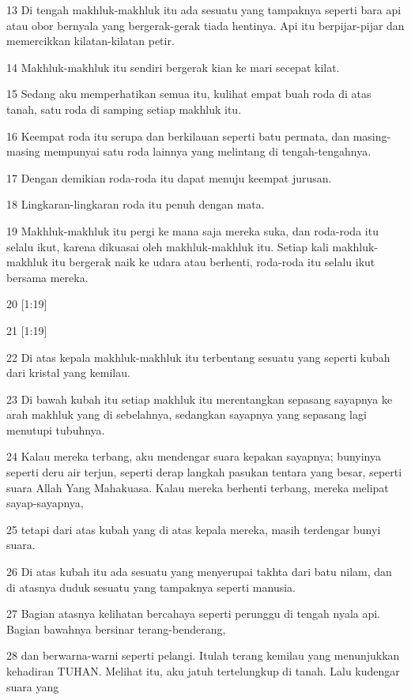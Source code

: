 \par 13 Di tengah makhluk-makhluk itu ada sesuatu yang tampaknya seperti bara api atau obor bernyala yang bergerak-gerak tiada hentinya. Api itu berpijar-pijar dan memercikkan kilatan-kilatan petir.
\par 14 Makhluk-makhluk itu sendiri bergerak kian ke mari secepat kilat.
\par 15 Sedang aku memperhatikan semua itu, kulihat empat buah roda di atas tanah, satu roda di samping setiap makhluk itu.
\par 16 Keempat roda itu serupa dan berkilauan seperti batu permata, dan masing-masing mempunyai satu roda lainnya yang melintang di tengah-tengahnya.
\par 17 Dengan demikian roda-roda itu dapat menuju keempat jurusan.
\par 18 Lingkaran-lingkaran roda itu penuh dengan mata.
\par 19 Makhluk-makhluk itu pergi ke mana saja mereka suka, dan roda-roda itu selalu ikut, karena dikuasai oleh makhluk-makhluk itu. Setiap kali makhluk-makhluk itu bergerak naik ke udara atau berhenti, roda-roda itu selalu ikut bersama mereka.
\par 20 [1:19]
\par 21 [1:19]
\par 22 Di atas kepala makhluk-makhluk itu terbentang sesuatu yang seperti kubah dari kristal yang kemilau.
\par 23 Di bawah kubah itu setiap makhluk itu merentangkan sepasang sayapnya ke arah makhluk yang di sebelahnya, sedangkan sayapnya yang sepasang lagi menutupi tubuhnya.
\par 24 Kalau mereka terbang, aku mendengar suara kepakan sayapnya; bunyinya seperti deru air terjun, seperti derap langkah pasukan tentara yang besar, seperti suara Allah Yang Mahakuasa. Kalau mereka berhenti terbang, mereka melipat sayap-sayapnya,
\par 25 tetapi dari atas kubah yang di atas kepala mereka, masih terdengar bunyi suara.
\par 26 Di atas kubah itu ada sesuatu yang menyerupai takhta dari batu nilam, dan di atasnya duduk sesuatu yang tampaknya seperti manusia.
\par 27 Bagian atasnya kelihatan bercahaya seperti perunggu di tengah nyala api. Bagian bawahnya bersinar terang-benderang,
\par 28 dan berwarna-warni seperti pelangi. Itulah terang kemilau yang menunjukkan kehadiran TUHAN. Melihat itu, aku jatuh tertelungkup di tanah. Lalu kudengar suara yang

